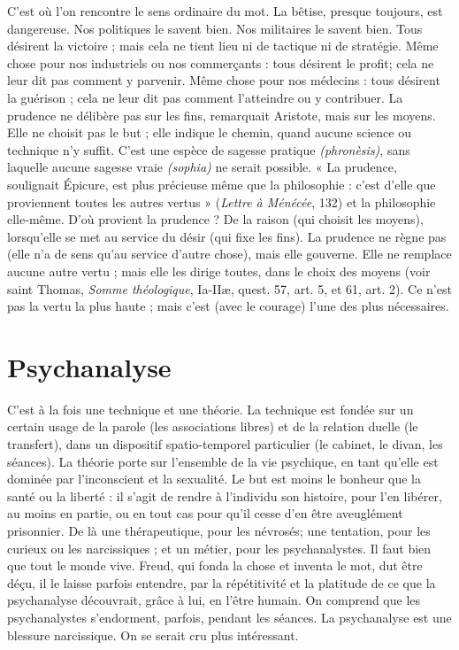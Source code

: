 C’est où l’on rencontre le sens ordinaire du mot. La bêtise, presque toujours,
est dangereuse. Nos politiques le savent bien. Nos militaires le savent
bien. Tous désirent la victoire ; mais cela ne tient lieu ni de tactique ni de stratégie.
Même chose pour nos industriels ou nos commerçants : tous désirent le
profit; cela ne leur dit pas comment y parvenir. Même chose pour nos
médecins : tous désirent la guérison ; cela ne leur dit pas comment l’atteindre
ou y contribuer. La prudence ne délibère pas sur les fins, remarquait Aristote,
mais sur les moyens. Elle ne choisit pas le but ; elle indique le chemin, quand
aucune science ou technique n’y suffit. C’est une espèce de sagesse pratique
{\it (phronèsis)}, sans laquelle aucune sagesse vraie {\it (sophia)} ne serait possible. « La
prudence, soulignait Épicure, est plus précieuse même que la philosophie : c’est
d’elle que proviennent toutes les autres vertus » ({\it Lettre à Ménécée}, 132) et la
philosophie elle-même. D’où provient la prudence ? De la raison (qui choisit
les moyens), lorsqu'elle se met au service du désir (qui fixe les fins). La prudence
ne règne pas (elle n’a de sens qu’au service d’autre chose), mais elle gouverne.
Elle ne remplace aucune autre vertu ; mais elle les dirige toutes, dans le
choix des moyens (voir saint Thomas, {\it Somme théologique}, Ia-IIæ, quest. 57,
art. 5, et 61, art. 2). Ce n’est pas la vertu la plus haute ; mais c’est (avec le courage)
l’une des plus nécessaires.

\section{Psychanalyse}
C’est à la fois une technique et une théorie. La technique
est fondée sur un certain usage de la parole (les associations
libres) et de la relation duelle (le transfert), dans un dispositif spatio-temporel
particulier (le cabinet, le divan, les séances). La théorie porte sur
l’ensemble de la vie psychique, en tant qu’elle est dominée par l’inconscient
et la sexualité. Le but est moins le bonheur que la santé ou la liberté : il s’agit
de rendre à l'individu son histoire, pour l’en libérer, au moins en partie, ou
en tout cas pour qu'il cesse d’en être aveuglément prisonnier. De là une thérapeutique,
pour les névrosés; une tentation, pour les curieux ou les
narcissiques ; et un métier, pour les psychanalystes. Il faut bien que tout le
monde vive.
Freud, qui fonda la chose et inventa le mot, dut être déçu, il le laisse parfois
entendre, par la répétitivité et la platitude de ce que la psychanalyse découvrait,
grâce à lui, en l’être humain. On comprend que les psychanalystes s’endorment,
parfois, pendant les séances. La psychanalyse est une blessure narcissique.
On se serait cru plus intéressant.

